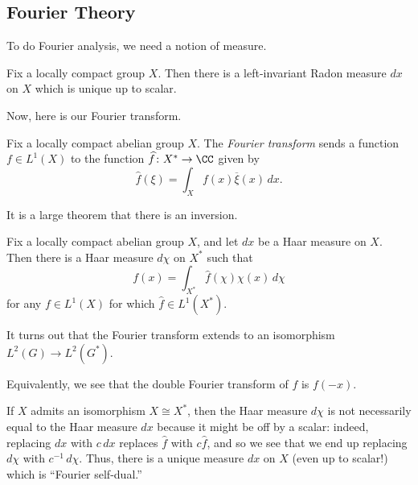 \documentclass[../notes.tex]{subfiles}
\begin{document}
\subsection{Fourier Theory}
To do Fourier analysis, we need a notion of measure.
\begin{theorem}[Haar]
	Fix a locally compact group $X$. Then there is a left-invariant Radon measure $dx$ on $X$ which is unique up to scalar.
\end{theorem}
Now, here is our Fourier transform.
\begin{definition}
	Fix a locally compact abelian group $X$. The \textit{Fourier transform} sends a function $f\in L^1(X)$ to the function $\widehat f\colon X^*\to\CC$ given by
	\[\widehat f(\xi)=\int_Xf(x)\overline\xi(x)\,dx.\]
\end{definition}
It is a large theorem that there is an inversion.
\begin{theorem} \label{thm:fourier-inversion}
	Fix a locally compact abelian group $X$, and let $dx$ be a Haar measure on $X$. Then there is a Haar measure $d\chi$ on $X^*$ such that
	\[f(x)=\int_{X^*}\widehat f(\chi)\chi(x)\,d\chi\]
	for any $f\in L^1(X)$ for which $\widehat f\in L^1(X^*)$.
\end{theorem}
\begin{remark}
	It turns out that the Fourier transform extends to an isomorphism $L^2(G)\to L^2(G^*)$.
\end{remark}
\begin{remark}
	Equivalently, we see that the double Fourier transform of $f$ is $f(-x)$.
\end{remark}
\begin{remark} \label{rem:self-dual-haar}
	If $X$ admits an isomorphism $X\cong X^*$, then the Haar measure $d\chi$ is not necessarily equal to the Haar measure $dx$ because it might be off by a scalar: indeed, replacing $dx$ with $c\,dx$ replaces $\widehat f$ with $c\widehat f$, and so we see that we end up replacing $d\chi$ with $c^{-1}\,d\chi$. Thus, there is a unique measure $dx$ on $X$ (even up to scalar!) which is ``Fourier self-dual.''
\end{remark}
\end{document}

